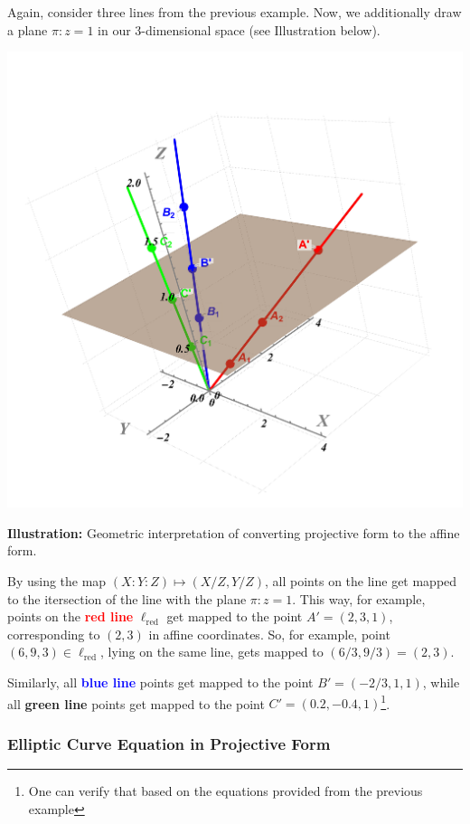 \documentclass[../lecture-notes.tex]{subfiles}
\begin{document}
\begin{example}
    Again, consider three lines from the previous example. Now, we additionally draw a plane $\pi: z=1$ in our 3-dimensional space (see Illustration below).

    \begin{center}
        \includegraphics[trim={100 100 100 200}, width=0.45\linewidth, clip]{images/lecture_4/line_2.pdf}
        
        \scriptsize{\textbf{Illustration:} Geometric interpretation of converting projective form to the affine form.}
    \end{center}

    By using the map $(X:Y:Z) \mapsto (X/Z,Y/Z)$, all points on the line get mapped to the itersection of the line with the plane $\pi: z=1$. This way, for example, points on the \textcolor{red}{\textbf{red line}} $\ell_{\text{red}}$ get mapped to the point $A'=(2,3,1)$, corresponding to $(2,3)$ in affine coordinates. So, for example, point $(6,9,3) \in \ell_{\text{red}}$, lying on the same line, gets mapped to $(6/3,9/3) = (2,3)$.

    Similarly, all \textcolor{blue}{\textbf{blue line}} points get mapped to the point $B'=(-2/3,1,1)$, while all \textcolor{green!60!black}{\textbf{green line}} points get mapped to the point $C'=(0.2,-0.4,1)$\footnote{One can verify that based on the equations provided from the previous example}.
\end{example}

\subsubsection{Elliptic Curve Equation in Projective Form}
\end{document}
